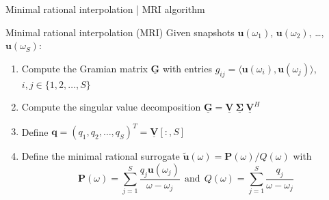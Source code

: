 \documentclass{beamer}
\begin{document}
\begin{frame}{Minimal rational interpolation | MRI algorithm}

    \begin{block}{Minimal rational interpolation (MRI) \cite{greedyMRI}}
        Given snapshots $\mathbf{u}(\omega_1)$, $\mathbf{u}(\omega_2)$, \dots, $\mathbf{u}(\omega_S)$:
        \begin{enumerate}
            \item<2-> Compute the Gramian matrix $\mathbf{\underline{G}}$ with entries $g_{ij} = \langle \mathbf{u}(\omega_i), \mathbf{u}(\omega_j) \rangle$, $i,j \in \{1, 2, \dots, S\}$
            \item<3-> Compute the singular value decomposition $\mathbf{\underline{G}} = \mathbf{\underline{V}}~\boldsymbol{\underline{\Sigma}}~\mathbf{\underline{V}}^H$
            \item<4-> Define $\mathbf{q} = (q_1, q_2, \dots, q_S)^T = \mathbf{\underline{V}}[:, S]$
            \item<5-> Define the minimal rational surrogate $\mathbf{\tilde{u}}(\omega) = \mathbf{P}(\omega) / Q(\omega)$ with 
            \begin{equation*}
                \mathbf{P}(\omega) = \sum_{j=1}^S \frac{q_j \mathbf{u}(\omega_j)}{\omega - \omega_j}~~\text{and}~~Q(\omega) = \sum_{j=1}^S \frac{q_j}{\omega - \omega_j}
            \end{equation*}
        \end{enumerate}
    \end{block}

\end{frame}
\end{document}
